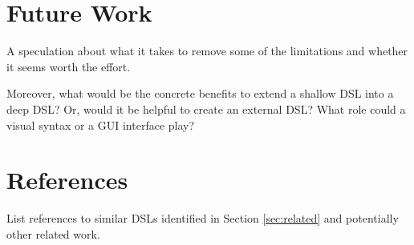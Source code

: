 \documentclass[11pt]{article}
\begin{document}



\section{Future Work}
\label{sec:future}

A speculation about what it takes to remove some of the limitations and
whether it seems worth the effort.

Moreover, what would be the concrete benefits to extend a shallow DSL into a
deep DSL? Or, would it be helpful to create an external DSL? What role could a
visual syntax or a GUI interface play?



\section*{References}

List references to similar DSLs identified in Section \ref{sec:related} and
potentially other related work.


%
\end{document}
